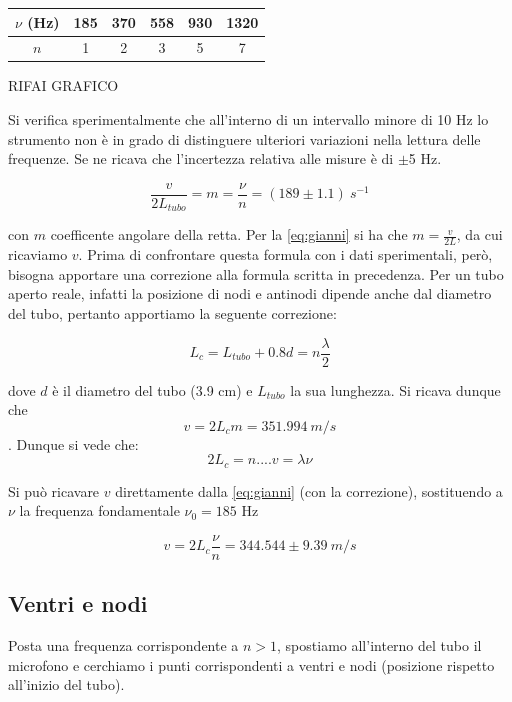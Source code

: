 \documentclass[a4paper,10pt]{report}
\begin{document}
\begin{center}
\begin{tabular}{c|c|c|c|c|c}
$\nu$ (Hz) & 185 & 370 & 558 & 930 & 1320 \\
\midrule
$n$ & 1 & 2 & 3 & 5 & 7\\
\end{tabular}
\end{center}

RIFAI GRAFICO

Si verifica sperimentalmente che all'interno di un intervallo minore di 10 Hz lo strumento non è in grado di distinguere ulteriori variazioni nella lettura delle frequenze. Se ne ricava che l'incertezza relativa alle misure è di $\pm$5 Hz.

$$ \frac{v}{2L_{tubo}} = m = \frac{\nu}{n} = (189 \pm 1.1)\ s^{-1}$$

con $m$  coefficente angolare della retta. Per la \ref{eq:gianni} si ha che $\displaystyle{m=\frac{v}{2L}}$, da cui ricaviamo $v$. Prima di confrontare questa formula con i dati sperimentali, però, bisogna apportare una correzione alla formula scritta in precedenza. Per un tubo aperto reale, infatti la posizione di nodi e antinodi dipende anche dal diametro del tubo, pertanto apportiamo la seguente correzione:

$$ L_c = L_{tubo}+0.8d = n\frac{\lambda}{2} $$

dove $d$ è il diametro del tubo (3.9 cm) e $L_{tubo}$ la sua lunghezza. 
Si ricava dunque che $$v=2L_cm=351.994\ m/s$$.
Dunque si vede che:
$$ 2L_c= n.... v = \lambda\nu$$

Si può ricavare $v$ direttamente dalla \ref{eq:gianni} (con la correzione), sostituendo a $\nu$ la frequenza fondamentale $\nu_0 = 185$ Hz

$$ v = 2L_c\frac{\nu}{n} = 344.544\pm9.39\ m/s$$ 
   
 
\subsection{Ventri e nodi}

Posta una frequenza corrispondente a $n>1$, spostiamo all'interno del tubo il microfono e cerchiamo i punti corrispondenti a ventri e nodi (posizione rispetto all'inizio del tubo).\\
\end{document}
